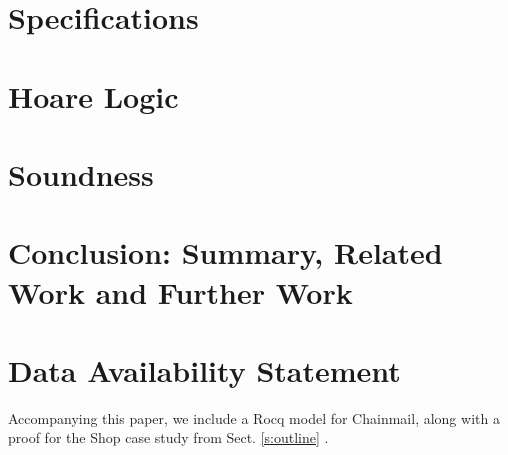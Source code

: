 \documentclass[acmsmall]{acmart}
\begin{document}
\section{ Specifications}
\label{sect:spec}    



\section{Hoare Logic} %
\label{sect:proofSystem}
 
 
 
 \section{Soundness} %
 \label{sect:sound:proofSystem}


%

  \section{Conclusion: Summary, Related Work and Further Work}
 \label{sect:related}
\label{sect:conclusion}
 


\section*{Data Availability Statement}

Accompanying this paper, we include a Rocq model for Chainmail, along with a proof for the Shop case study from Sect. \ref{s:outline} \cite{CoqOOPSLA25}.



%
% 
%
% 

%
%
\end{document}

